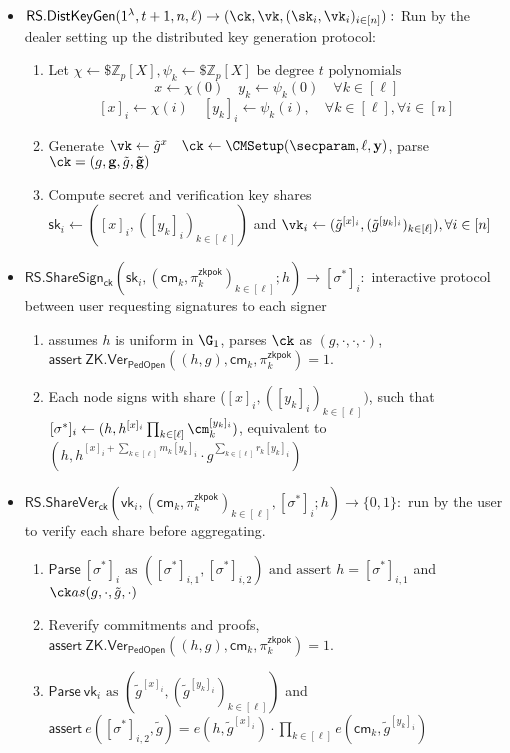 \begin{itemize}
    \item $\mathsf{RS.DistKeyGen}(1^\lambda, t+1, n, \ell) \to (\ck, \vk, (\sk_i, \vk_i)_{i \in [n]}):$ Run by the dealer setting up the distributed key generation protocol:
    \begin{enumerate}
        \item Let $\chi \gets\$ \mathbb{Z}_p[X], \psi_k \gets\$ \mathbb{Z}_p[X] \text{ be degree $t$ polynomials}$
        \[
        x \gets \chi(0) \quad y_k \gets \psi_k(0) \quad \forall k \in [\ell] 
        \]
        \[
        [x]_i \gets \chi(i) \quad [y_k]_i \gets \psi_k(i), \quad \forall k \in [\ell], \forall i \in [n]
        \]
        \item Generate $\vk \gets \tilde{g}^x \quad \ck \gets \CMSetup(\secparam, \ell, \mathbf{y})$, parse $\ck = (g, \mathbf{g}, \tilde{g},\mathbf{\tilde{g}} )$
        \item Compute secret and verification key shares $\mathsf{sk}_i \gets ([x]_i, ([y_k]_i)_{k\in[\ell]})$ and $ \vk_i \gets (\tilde{g}^{[x]_i}, (\tilde{g}^{[y_k]_i})_{k\in[\ell]}), \forall i \in [n]$
    \end{enumerate}

    \item $\mathsf{RS.ShareSign_{ck}}(\mathsf{sk}_i, (\mathsf{cm}_k, \pi_k^{\mathsf{zkpok}})_{k\in[\ell]}; h) \to [\sigma^*]_i:$ interactive protocol between user requesting signatures to each signer
    \begin{enumerate}
        \item assumes $h$ is uniform in $\G_1$, parses $\ck$ as $(g,\cdot,\cdot,\cdot)$, $\mathsf{assert~ZK.Ver_{PedOpen}}((h, g), \mathsf{cm}_k, \pi_k^{\mathsf{zkpok}}) = 1$. 
        \item Each node signs with share ($[x]_i, ([y_k]_i)_{k\in[\ell]})$, such that $[\sigma^*]_i \gets (h, h^{[x]_i} \prod_{k\in[\ell]}\cm_k^{[y_k]_i})$, equivalent to $(h, h^{[x]_i+\sum_{k\in[\ell]} m_k[y_k]_i} \cdot g^{\sum_{k\in[\ell]} r_k[y_k]_i})$
    \end{enumerate}

    \item $\mathsf{RS.ShareVer_{ck}}(\mathsf{vk}_i, (\mathsf{cm}_k, \pi_k^{\mathsf{zkpok}})_{k\in[\ell]}, [\sigma^*]_i; h) \to \{0, 1\}:$ run by the user to verify each share before aggregating.
    \begin{enumerate}
        \item $\mathsf{Parse~} [\sigma^*]_i \text{ as } ([\sigma^*]_{i,1}, [\sigma^*]_{i,2}) \text{ and assert } h = [\sigma^*]_{i,1}$ and $\ck as (g, \cdot, \tilde{g}, \cdot)$
        \item Reverify commitments and proofs, $\mathsf{assert~ZK.Ver_{PedOpen}}((h, g), \mathsf{cm}_k, \pi_k^{\mathsf{zkpok}}) = 1$.
        \item $\mathsf{Parse~vk}_i \text{ as } (\tilde{g}^{[x]_i}, (\tilde{g}^{[y_k]_i})_{k\in[\ell]})$ and $\mathsf{assert~} e([\sigma^*]_{i,2}, \tilde{g}) = e(h, \tilde{g}^{[x]_i}) \cdot \prod_{k\in[\ell]} e(\mathsf{cm}_k, \tilde{g}^{[y_k]_i})$
    \end{enumerate}


\end{itemize}
